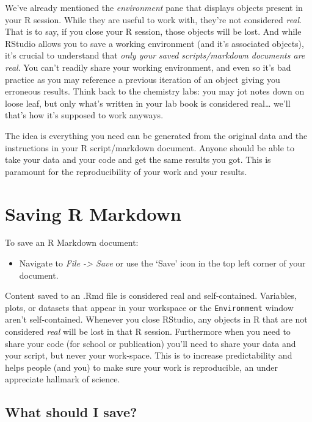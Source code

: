 \documentclass[
]{book}
\providecommand{\tightlist}{%
  \setlength{\itemsep}{0pt}\setlength{\parskip}{0pt}}
\begin{document}
We've already mentioned the \emph{environment} pane that displays objects present in your R session. While they are useful to work with, they're not considered \emph{real}. That is to say, if you close your R session, those objects will be lost. And while RStudio allows you to save a working environment (and it's associated objects), it's crucial to understand that \emph{only your saved scripts/markdown documents are real}. You can't readily share your working environment, and even so it's bad practice as you may reference a previous iteration of an object giving you erroneous results. Think back to the chemistry labs: you may jot notes down on loose leaf, but only what's written in your lab book is considered real\ldots{} we'll that's how it's supposed to work anyways.

The idea is everything you need can be generated from the original data and the instructions in your R script/markdown document. Anyone should be able to take your data and your code and get the same results you got. This is paramount for the reproducibility of your work and your results.

\hypertarget{saving-r-markdown}{%
\section{Saving R Markdown}\label{saving-r-markdown}}

To save an R Markdown document:

\begin{itemize}
\tightlist
\item
  Navigate to \emph{File -\textgreater{} Save} or use the `Save' icon in the top left corner of your document.
\end{itemize}

Content saved to an .Rmd file is considered real and self-contained. Variables, plots, or datasets that appear in your workspace or the \texttt{Environment} window aren't self-contained. Whenever you close RStudio, any objects in R that are not considered \emph{real} will be lost in that R session. Furthermore when you need to share your code (for school or publication) you'll need to share your data and your script, but never your work-space. This is to increase predictability and helps people (and you) to make sure your work is reproducible, an under appreciate hallmark of science.

\hypertarget{what-should-i-save}{%
\subsection{What should I save?}\label{what-should-i-save}}
\end{document}
